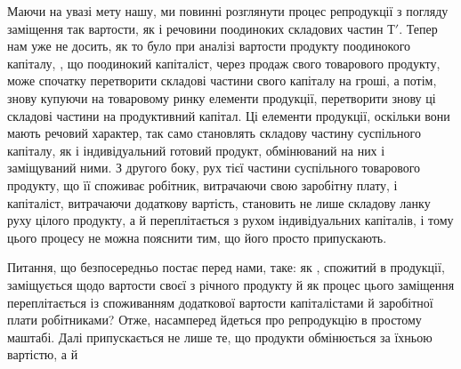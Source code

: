 Маючи на увазі мету нашу, ми повинні розглянути процес репродукції
з погляду заміщення так вартости, як і речовини поодиноких складових
частин $Т'$. Тепер нам уже не досить, як то було при аналізі вартости
продукту поодинокого капіталу, , що поодинокий
капіталіст, через продаж свого товарового продукту, може спочатку перетворити
складові частини свого капіталу на гроші, а потім, знову купуючи
на товаровому ринку елементи продукції, перетворити знову ці
складові частини на продуктивний капітал. Ці елементи продукції, оскільки
вони мають речовий характер, так само становлять складову частину
суспільного капіталу, як і індивідуальний готовий продукт, обмінюваний
на них і заміщуваний ними. З другого боку, рух тієї частини суспільного
товарового продукту, що її споживає робітник, витрачаючи свою
заробітну плату, і капіталіст, витрачаючи додаткову вартість, становить не
лише складову ланку руху цілого продукту, а й переплітається з рухом
індивідуальних капіталів, і тому цього процесу не можна пояснити тим,
що його просто припускають.

Питання, що безпосередньо постає перед нами, таке: як ,
спожитий в продукції, заміщується щодо вартости своєї з річного продукту
й як процес цього заміщення переплітається із споживанням додаткової
вартости капіталістами й заробітної плати робітниками? Отже,
насамперед йдеться про репродукцію в простому маштабі. Далі припускається
не лише те, що продукти обмінюється за їхньою вартістю, а й
\parbreak{}  %
